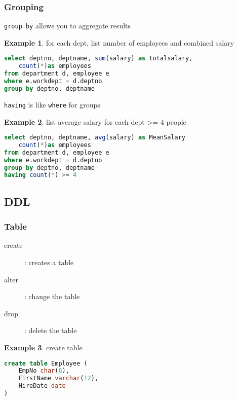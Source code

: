 \documentclass[]{article}
\theoremstyle{definition}
\newtheorem{ex}{Example}[section]
\begin{document}
			\subsubsection{Grouping}
				\lstinline|group by| allows you to aggregate results
				\begin{ex} for each dept, list number of employees and combined salary
				\begin{lstlisting}[language=SQL]
select deptno, deptname, sum(salary) as totalsalary,
	count(*)as employees
from department d, employee e
where e.workdept = d.deptno 
group by deptno, deptname				
				\end{lstlisting}
				\end{ex}
				\lstinline|having| is like \lstinline|where| for groups
				\begin{ex}
					list average salary for each dept >= 4 people
					\begin{lstlisting}[language=SQL]
select deptno, deptname, avg(salary) as MeanSalary
	count(*)as employees
from department d, employee e
where e.workdept = d.deptno 
group by deptno, deptname
having count(*) >= 4
					\end{lstlisting}
				\end{ex}
		\subsection{DDL}
			\subsubsection{Table}
				\begin{description}
					\item[create]: creates a table
					\item[alter]: change the table
					\item[drop]: delete the table
				\end{description}
				\begin{ex}
					create table
					\begin{lstlisting}[language=SQL]
create table Employee (
	EmpNo char(6),
	FirstName varchar(12),
	HireDate date
)				
					\end{lstlisting}
				\end{ex}
\end{document}
